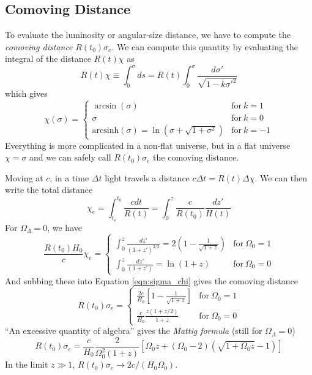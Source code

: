 \documentclass[]{article}
\begin{document}
\subsection{Comoving Distance}
To evaluate the luminosity or angular-size distance, we have to
compute the {\it comoving distance} $R(t_0) \sigma_e$.  We can
compute this quantity by evaluating the integral of the distance
$R(t)\chi$ as
\begin{equation}
R(t) \chi \equiv \int_0^{\sigma} ds = R(t)\int_0^\sigma \frac{d\sigma'}{\sqrt{1-k\sigma'^2}}
\end{equation}
\noindent
which gives
\begin{equation}
\label{eqn:sigma_chi}
\chi(\sigma) = \left\{ \begin{array}{lll}\arcsin(\sigma) & \mathrm{for}~k=1\\ \sigma & \mathrm{for}~k=0 \\ \mathrm{arcsinh}(\sigma) = \ln(\sigma + \sqrt{1+\sigma^2}) & \mathrm{for}~k=-1\end{array}\right.
\end{equation}
\noindent
Everything is more complicated in a non-flat universe, but in a flat universe $\chi = \sigma$ and we can safely call $R(t_0) \sigma_e$ the comoving distance.

Moving at $c$, in a time $\Delta t$ light travels a distance $c \Delta t = R(t)\Delta \chi$.  We can then write the total distance
\begin{equation}
\chi_e = \int_{t_e}^{t_0}\frac{c dt}{R(t)} = \int_0^{z} \frac{c}{R(t_0)}\frac{dz'}{H(t)}
\end{equation}
\noindent
For $\Omega_\Lambda=0$, we have
\begin{equation}
\frac{R(t_0) H_0}{c} \chi_e = \left\{ \begin{array}{ll} \int_0^{z} \frac{dz'}{(1+z')^{3/2}}  = 2 \left( 1 - \frac{1}{\sqrt{1+z}}\right) & \mathrm{for}~\Omega_0=1 \\ \int_0^z \frac{dz'}{(1+z')} = \ln(1+z) & \mathrm{for}~\Omega_0 = 0 \end{array}\right.
\end{equation}
\noindent
And subbing these into Equation \ref{eqn:sigma_chi} gives the comoving distance
\begin{equation}
R(t_0) \sigma_e = \left\{ \begin{array}{ll} \frac{2c}{H_0} \left[1 - \frac{1}{\sqrt{1+z}} \right] & \mathrm{for}~\Omega_0 = 1 \\ \frac{c}{H_0}\frac{z(1+z/2)}{1+z} & \mathrm{for}~\Omega_0=0 \end{array}\right.
\end{equation}
\noindent
``An excessive quantity of algebra'' gives the {\it Mattig formula} (still for $\Omega_\Lambda=0$)
\begin{equation}
R(t_0) \sigma_e = \frac{c}{H_0} \frac{2}{\Omega_0^2 (1+z)}[\Omega_0 z + (\Omega_0 - 2)(\sqrt{1+\Omega_0 z}-1)]
\end{equation}
\noindent
In the limit $z\gg1$, $R(t_0)\sigma_e \to 2 c/(H_0\Omega_0)$.
\end{document}
